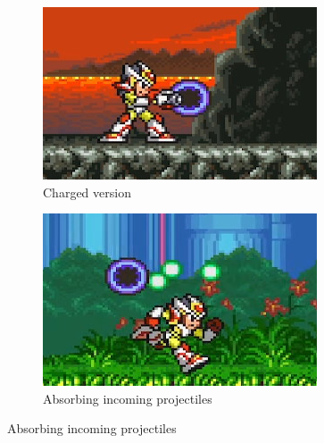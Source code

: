 	\begin{figure}[htp]
		\ContinuedFloat
		\centering
	\begin{subfigure}[t]{0.4\linewidth}
		\centering
		\includegraphics[width=\linewidth]{figures/X2/weapons/M_mine_3.png}	
		\caption{Charged version}
	\end{subfigure}
	\begin{subfigure}[t]{0.4\linewidth}
		\centering
		\includegraphics[width=\linewidth]{figures/X2/weapons/M_mine_4.png}	
		\caption{Absorbing incoming projectiles}
	\end{subfigure}
	\end{figure}
